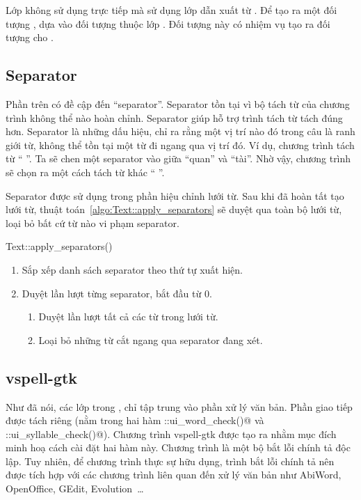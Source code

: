 \documentclass[a4paper,oneside,14pt]{extbook} %
\begin{document}
Lớp \verb@VSpell@ không sử dụng trực tiếp \verb@Text@ mà sử dụng lớp
dẫn xuất từ \verb@Text@. Để tạo ra một đối tượng \verb@Text@,
\verb@VSpell@ dựa vào đối tượng thuộc lớp \verb@TextFactory@. Đối
tượng này có nhiệm vụ tạo ra đối tượng \verb@Text@ cho \verb@VSpell@. 


\subsection{Separator}

Phần trên có đề cập đến ``separator''. Separator tồn tại vì bộ tách từ
của chương trình không thể nào hoàn chỉnh.  Separator giúp hỗ trợ
trình tách từ tách đúng hơn. Separator là những dấu hiệu, chỉ ra rằng
một vị trí nào đó trong câu là ranh giới từ, không thể tồn tại một từ
đi ngang qua vị trí đó. Ví dụ, chương trình tách từ ``
  ''. Ta sẽ chen một separator vào
giữa ``quan'' và ``tài''. Nhờ vậy, chương trình sẽ chọn ra một cách
tách từ khác ``   
''.

Separator được sử dụng trong phần hiệu chỉnh lưới từ. Sau khi đã hoàn
tất tạo lưới từ, thuật toán~\ref{algo:Text::apply_separators} sẽ duyệt qua toàn bộ lưới từ, loại bỏ bất
cứ từ nào vi phạm separator.
\begin{algo}
\caption{Text::apply\_separators()}
\label{algo:Text::apply_separators}
\begin{enumerate}
\item Sắp xếp danh sách separator theo thứ tự xuất hiện.
\item Duyệt lần lượt từng separator, bắt đầu từ $0$.
  \begin{enumerate}
  \item Duyệt lần lượt tất cả các từ trong lưới từ.
  \item Loại bỏ những từ cắt ngang qua separator đang xét.
  \end{enumerate}
\end{enumerate}
\end{algo}

\subsection{vspell-gtk}

Như đã nói, các lớp trong \verb@VSpell@, \verb@Text@ chỉ tập trung vào
phần xử lý văn bản. Phần giao tiếp được tách riêng (nằm trong hai hàm
\verb@Text::ui_word_check()@ và
\verb@Text::ui_syllable_check()@). Chương trình vspell-gtk được tạo ra
nhằm mục đích minh hoạ cách cài đặt hai hàm này. Chương trình là một
bộ bắt lỗi chính tả độc lập. Tuy nhiên, để chương trình thực sự hữu
dụng, trình bắt lỗi chính tả nên được tích hợp với các chương trình
liên quan đến xử lý văn bản như AbiWord, OpenOffice, GEdit,
Evolution~\ldots
\end{document}
